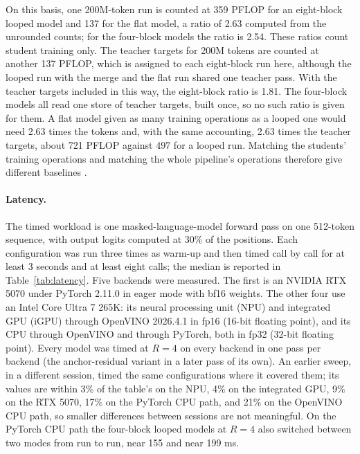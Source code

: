 \documentclass[11pt]{article}
\begin{document}
On this basis, one 200M-token run is counted at 359 PFLOP for an eight-block looped model and 137 for the flat model, a ratio of 2.63
computed from the unrounded counts; for the four-block models the ratio is 2.54. These ratios count student training only. The teacher targets
for 200M tokens are counted at another 137 PFLOP, which is assigned to each eight-block run here, although the looped run with the merge and the
flat run shared one teacher pass. With the teacher targets included in this way, the eight-block ratio is 1.81. The four-block models all read
one store of teacher targets, built once, so no such ratio is given for them. A flat model given as many training operations as
a looped one would need 2.63 times the tokens and, with the same accounting, 2.63 times the teacher targets, about 721 PFLOP against 497 for a
looped run. Matching the students' training operations and matching the whole pipeline's operations therefore give different baselines
\citep{kaplan2020scaling,hoffmann2022chinchilla}.

\paragraph{Latency.}
The timed workload is one masked-language-model forward pass on one 512-token sequence, with output logits computed at 30\% of the positions.
Each configuration was run three times as warm-up and then timed call by call for at least 3 seconds and at least eight calls; the median is reported in
Table~\ref{tab:latency}. Five backends were measured. The first is an NVIDIA RTX 5070 under PyTorch 2.11.0 \citep{paszke2019pytorch} in eager mode with bf16
weights. The other four use an Intel Core Ultra 7 265K: its neural processing unit (NPU) and integrated GPU (iGPU) through OpenVINO 2026.4.1
\citep{openvino} in fp16 (16-bit floating point), and its CPU through OpenVINO and through PyTorch, both in fp32 (32-bit floating point). Every model was timed at $R = 4$ on every backend in one pass per backend (the anchor-residual variant in a later
pass of its own). An earlier sweep, in a different session, timed the same configurations where it covered them; its values are within 3\% of
the table's on the NPU, 4\% on the integrated GPU, 9\% on the RTX 5070, 17\% on the PyTorch CPU path, and 21\% on the OpenVINO CPU path, so
smaller differences between sessions are not meaningful. On the PyTorch CPU path the four-block looped models at $R = 4$ also switched between
two modes from run to run, near 155 and near 199 ms.
\end{document}
